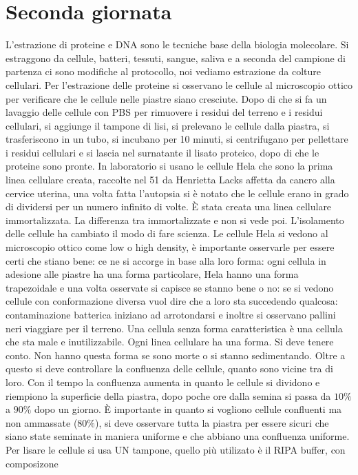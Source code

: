 \section{Seconda giornata}
L'estrazione di proteine e DNA sono le tecniche base della biologia molecolare. Si estraggono da cellule, batteri, tessuti, sangue, saliva e a seconda del campione di partenza ci sono
modifiche al protocollo, noi vediamo estrazione da colture cellulari. Per l'estrazione delle proteine si osservano le cellule al microscopio ottico per verificare che le cellule nelle
piastre siano cresciute. Dopo di che si fa un lavaggio delle cellule con PBS per rimuovere i residui del terreno e i residui cellulari, si aggiunge il tampone di lisi, si prelevano
le cellule dalla piastra, si trasferiscono in un tubo, si incubano per 10 minuti, si centrifugano per pellettare i residui cellulari e si lascia nel surnatante il lisato proteico, 
dopo di che le proteine sono pronte. In laboratorio si usano le cellule Hela che sono la prima linea cellulare creata, raccolte nel 51 da Henrietta Lacks affetta da cancro alla 
cervice uterina, una volta fatta l'autopsia si \`e notato che le cellule erano in grado di dividersi per un numero infinito di volte. \`E stata creata una linea cellulare immortalizzata.
La differenza tra immortalizzate e non si vede poi. L'isolamento delle cellule ha cambiato il modo di fare scienza. Le cellule Hela si vedono al microscopio ottico come low o high 
density, \`e importante osservarle per essere certi che stiano bene: ce ne si accorge in base alla loro forma: ogni cellula in adesione alle piastre ha una forma particolare, Hela
hanno una forma trapezoidale e una volta osservate si capisce se stanno bene o no: se si vedono cellule con conformazione diversa vuol dire che a loro sta succedendo qualcosa: 
contaminazione batterica iniziano ad arrotondarsi e inoltre si osservano pallini neri viaggiare per il terreno. Una cellula senza forma caratteristica \`e una cellula che sta male e 
inutilizzabile. Ogni linea cellulare ha una forma. Si deve tenere conto. Non hanno questa forma se sono morte o si stanno sedimentando. Oltre a questo si deve controllare la confluenza
delle cellule, quanto sono vicine tra di loro. Con il tempo la confluenza aumenta in quanto le cellule si dividono e riempiono la superficie della piastra, dopo poche ore dalla semina
si passa da $10\%$ a $90\%$ dopo un giorno. \`E importante in quanto si vogliono cellule confluenti ma non ammassate ($80\%$), si deve osservare tutta la piastra per essere sicuri
che siano state seminate in maniera uniforme e che abbiano una confluenza uniforme. Per lisare le cellule si usa UN tampone, quello pi\`u utilizato \`e il RIPA buffer, con composizone

